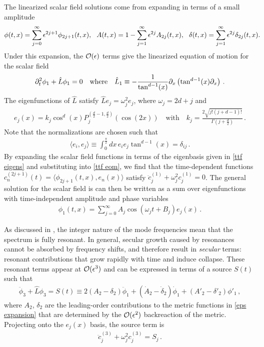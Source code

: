 \documentclass[../PhD.tex]{subfiles}
\begin{document}
The linearized scalar field solutions come from expanding in terms of a small amplitude
\begin{align}
\label{eps expansion}
\phi(t,x) = \sum_{j=0}^\infty \epsilon^{2j+1} \phi_{2j+1}(t,x), \quad \! \! A(t,x) = 1 - \sum_{j=1}^\infty \epsilon^{2j} A_{2j}(t,x), \quad \! \! \delta(t,x) = \sum_{j=1}^\infty \epsilon^{2j} \delta_{2j} (t,x) . \hspace{-0.1in}
\end{align}
Under this expansion, the $\mathcal O(\epsilon)$ terms give the linearized equation of motion for the scalar field
\begin{align}
\label{ttf eom}
\partial^2_t \phi_1 + \hat L \phi_1 = 0 \quad \text{where} \quad \hat L_1 \equiv - \frac{1}{\tan^{d-1}(x)} \partial_x \left( \tan^{d-1}(x) \partial_x \right) \, .
\end{align}
The eigenfunctions of $\hat L$ satisfy $\hat L e_j = \omega^2_j e_j$, where $\omega_j = 2d + j$ and 
\begin{align}
\label{ttf eigens}
e_j (x) = k_j \cos^d (x) P^{(\frac{d}{2} - 1, \frac{d}{2})}_j \left( \cos(2x) \right) \quad \text{with} \quad k_j = \frac{2 \sqrt{j! (j + d - 1)!}}{\Gamma(j + \frac{d}{2})} \, .
\end{align}
Note that the normalizations are chosen such that 
\begin{align}
\langle e_i,  e_j \rangle \equiv \int^{\frac{\pi}{2}}_0 dx \, e_i e_j \tan^{d-1}(x) = \delta_{ij}\, .
\end{align}
By expanding the scalar field functions in terms of the eigenbasis given in \eqref{ttf eigens} and substituting into \eqref{ttf eom}, we find that the time-dependent functions {$c^{(2j + 1)}_n (t) = \langle \phi_{2j + 1}(t,x), e_n (x) \rangle$} satisfy ${\ddot c_j^{(1)} + \omega^2_j c_j^{(1)} = 0}$. The general solution for the scalar field is can then be written as a sum over eigenfunctions with time-independent amplitude and phase variables
\begin{align}
\label{ttf phi}
\phi_1 (t,x) = \sum_{j=0}^\infty A_j \cos \left(\omega_j t + B_j \right) e_j (x) \, .
\end{align}

As discussed in \cite{1412.3249, 1407.6273, 1508.04943}, the integer nature of the mode frequencies mean that the spectrum is fully resonant. In general, secular growth caused by resonances cannot be absorbed by frequency shifts, and therefore result in \emph{secular} terms: resonant contributions that grow rapidly with time and induce collapse. These resonant terms appear at $\mathcal O (\epsilon^3)$ and can be expressed in terms of a source $S(t)$ such that 
\begin{align}
\ddot \phi_3 + \hat L \phi_3 = S(t) \equiv 2 (A_2 - \delta_2) \ddot \phi_1 + ( \dot A_2 - \dot \delta_2 ) \dot \phi_1 + (A'_2 - \delta'_2) \phi'_1 \, ,
\end{align}
where $A_2$, $\delta_2$ are the leading-order contributions to the metric functions in \eqref{eps expansion} that are determined by the $\mathcal O(\epsilon^2)$ backreaction of the metric. Projecting onto the $e_j(x)$ basis, the source term is
\begin{align}
\ddot c_j^{(3)} + \omega_j^2 c_j^{(3)} = S_j \, .
\end{align}  
\end{document}
